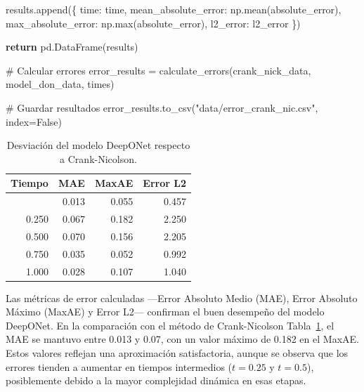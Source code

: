 \documentclass[
  spanish,
  us-letterpaper,
]{scrreprt}
\newenvironment{Shaded}{\begin{snugshade}}{\end{snugshade}}
\newcommand{\BuiltInTok}[1]{\textcolor[rgb]{0.00,0.23,0.31}{#1}}
\newcommand{\CommentTok}[1]{\textcolor[rgb]{0.37,0.37,0.37}{#1}}
\newcommand{\ControlFlowTok}[1]{\textcolor[rgb]{0.00,0.23,0.31}{\textbf{#1}}}
\newcommand{\NormalTok}[1]{\textcolor[rgb]{0.00,0.23,0.31}{#1}}
\newcommand{\OperatorTok}[1]{\textcolor[rgb]{0.37,0.37,0.37}{#1}}
\newcommand{\StringTok}[1]{\textcolor[rgb]{0.13,0.47,0.30}{#1}}
\newcommand{\VariableTok}[1]{\textcolor[rgb]{0.07,0.07,0.07}{#1}}
\theoremstyle{definition}
\theoremstyle{plain}
\theoremstyle{remark}
\begin{document}
\begin{Shaded}
\begin{Highlighting}[]
\NormalTok{        results.append(\{}
            \StringTok{\textquotesingle{}time\textquotesingle{}}\NormalTok{: time,}
            \StringTok{\textquotesingle{}mean\_absolute\_error\textquotesingle{}}\NormalTok{: np.mean(absolute\_error),}
            \StringTok{\textquotesingle{}max\_absolute\_error\textquotesingle{}}\NormalTok{: np.}\BuiltInTok{max}\NormalTok{(absolute\_error),}
            \StringTok{\textquotesingle{}l2\_error\textquotesingle{}}\NormalTok{: l2\_error}
\NormalTok{        \})}
    
    \ControlFlowTok{return}\NormalTok{ pd.DataFrame(results)}

\CommentTok{\# Calcular errores}
\NormalTok{error\_results }\OperatorTok{=}\NormalTok{ calculate\_errors(crank\_nick\_data, model\_don\_data, times)}

\CommentTok{\# Guardar resultados}
\NormalTok{error\_results.to\_csv(}\StringTok{"data/error\_crank\_nic.csv"}\NormalTok{, index}\OperatorTok{=}\VariableTok{False}\NormalTok{)}
\end{Highlighting}
\end{Shaded}

\begin{longtable}[]{@{}rrrr@{}}

\caption{\label{tbl-errores-num}Desviación del modelo DeepONet respecto
a Crank-Nicolson.}

\tabularnewline

\toprule\noalign{}
Tiempo & MAE & MaxAE & Error L2 \\
\midrule\noalign{}
\endhead
\bottomrule\noalign{}
\endlastfoot
0.000 & 0.013 & 0.055 & 0.457 \\
0.250 & 0.067 & 0.182 & 2.250 \\
0.500 & 0.070 & 0.156 & 2.205 \\
0.750 & 0.035 & 0.052 & 0.992 \\
1.000 & 0.028 & 0.107 & 1.040 \\

\end{longtable}

Las métricas de error calculadas ---Error Absoluto Medio (MAE), Error
Absoluto Máximo (MaxAE) y Error L2--- confirman el buen desempeño del
modelo DeepONet. En la comparación con el método de Crank-Nicolson
Tabla~\ref{tbl-errores-num}, el MAE se mantuvo entre 0.013 y 0.07, con
un valor máximo de 0.182 en el MaxAE. Estos valores reflejan una
aproximación satisfactoria, aunque se observa que los errores tienden a
aumentar en tiempos intermedios (\(t=0.25\) y \(t=0.5\)), posiblemente
debido a la mayor complejidad dinámica en esas etapas.
\end{document}
